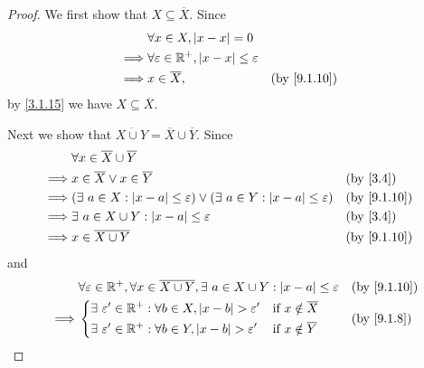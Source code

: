 \begin{proof}
  We first show that \(X \subseteq \overline{X}\).
  Since
  \begin{align*}
             & \forall x \in X, \abs{x - x} = 0                                                          \\
    \implies & \forall \varepsilon \in \R^+, \abs{x - x} \leq \varepsilon                                \\
    \implies & x \in \overline{X},                                        &  & \text{(by \cref{9.1.10})}
  \end{align*}
  by \cref{3.1.15} we have \(X \subseteq \overline{X}\).

  Next we show that \(\overline{X \cup Y} = \overline{X} \cup \overline{Y}\).
  Since
  \begin{align*}
             & \forall x \in \overline{X} \cup \overline{Y}                                                                                            \\
    \implies & x \in \overline{X} \lor x \in \overline{Y}                                                               &  & \text{(by \cref{3.4})}    \\
    \implies & (\exists\ a \in X : \abs{x - a} \leq \varepsilon) \lor (\exists\ a \in Y : \abs{x - a} \leq \varepsilon) &  & \text{(by \cref{9.1.10})} \\
    \implies & \exists\ a \in X \cup Y : \abs{x - a} \leq \varepsilon                                                   &  & \text{(by \cref{3.4})}    \\
    \implies & x \in \overline{X \cup Y}                                                                                &  & \text{(by \cref{9.1.10})}
  \end{align*}
  and
  \begin{align*}
             & \forall \varepsilon \in \R^+, \forall x \in \overline{X \cup Y}, \exists\ a \in X \cup Y : \abs{x - a} \leq \varepsilon &  & \text{(by \cref{9.1.10})} \\
    \implies & \begin{dcases}
                 \exists\ \varepsilon' \in \R^+ : \forall b \in X, \abs{x - b} > \varepsilon' & \text{if } x \notin \overline{X} \\
                 \exists\ \varepsilon' \in \R^+ : \forall b \in Y, \abs{x - b} > \varepsilon' & \text{if } x \notin \overline{Y}
               \end{dcases}      &  & \text{(by \cref{9.1.8})}                                        \\

\end{align*}
\end{proof}
